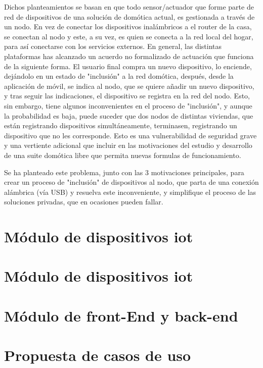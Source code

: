 Dichos planteamientos se basan en que todo sensor/actuador que forme parte de red de dispositivos de una solución de domótica actual, es gestionada a través de un nodo. En vez de conectar los dispositivos inalámbricos a el router de la casa, se conectan al nodo y este, a su vez, es quien se conecta a la red local del hogar, para así conectarse con los servicios externos. En general, las distintas plataformas has alcanzado un acuerdo no formalizado de actuación que funciona de la siguiente forma. El usuario final compra un nuevo dispositivo, lo enciende, dejándolo en un estado de "inclusión" a la red domótica, después, desde la aplicación de móvil, se indica al nodo, que se quiere añadir un nuevo dispositivo, y tras seguir las indicaciones, el dispositivo se registra en la red del nodo. Esto, sin embargo, tiene algunos inconvenientes en el proceso de "inclusión", y aunque la probabilidad es baja, puede suceder que dos nodos de distintas viviendas, que están registrando dispositivos simultáneamente, terminasen, registrando un dispositivo que no les corresponde. Esto es una vulnerabilidad de seguridad grave y una vertiente adicional que incluir en las motivaciones del estudio y desarrollo de una suite domótica libre que permita nuevas formulas de funcionamiento.

Se ha planteado este problema, junto con las 3 motivaciones principales, para crear un proceso de "inclusión" de dispositivos al nodo, que parta de una conexión alámbrica (vía USB) y resuelva este inconveniente, y simplifique el proceso de las soluciones privadas, que en ocasiones pueden fallar.

\vspace{1cm}


\section{Módulo de dispositivos \gls{iot}}
\label{ch:Capitulo3.3}


\section{Módulo de dispositivos \gls{iot}}
\label{ch:Capitulo3.4}


\section{Módulo de front-End y back-end}
\label{ch:Capitulo3.5}

\section{Propuesta de casos de uso}
\label{ch:Capitulo3.6}

